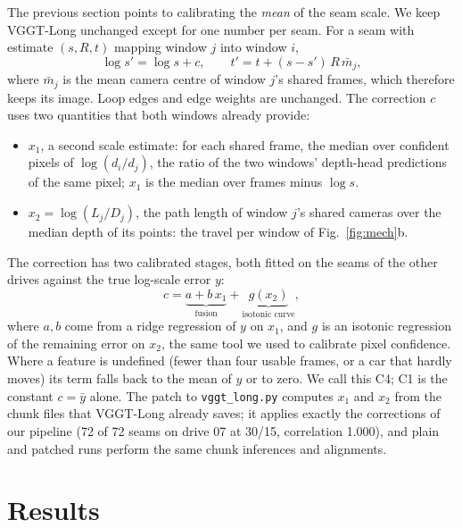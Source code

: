 \documentclass[conference]{IEEEtran}
\begin{document}
The previous section points to calibrating the \emph{mean} of the seam scale. We keep VGGT-Long unchanged except for one
number per seam. For a seam with estimate $(s,R,t)$ mapping window $j$ into window $i$,
\begin{equation}
\log s' = \log s + c,\qquad t' = t + (s-s')\,R\,\bar m_j,
\label{eq:correct}
\end{equation}
where $\bar m_j$ is the mean camera centre of window $j$'s shared frames, which therefore keeps its image. Loop edges and
edge weights are unchanged. The correction $c$ uses two quantities that both windows already provide:
\begin{itemize}
\item $x_1$, a second scale estimate: for each shared frame, the median over confident pixels of $\log(d_i/d_j)$, the
ratio of the two windows' depth-head predictions of the same pixel; $x_1$ is the median over frames minus $\log s$.
\item $x_2=\log(L_j/D_j)$, the path length of window $j$'s shared cameras over the median depth of its points: the
travel per window of Fig.~\ref{fig:mech}b.
\end{itemize}
The correction has two calibrated stages, both fitted on the seams of the other drives against the true log-scale error
$y$:
\begin{equation}
c = \underbrace{a + b\,x_1}_{\text{fusion}} + \underbrace{g(x_2)}_{\text{isotonic curve}},
\end{equation}
where $a,b$ come from a ridge regression of $y$ on $x_1$, and $g$ is an isotonic regression \cite{kuleshov} of the
remaining error on $x_2$, the same tool we used to calibrate pixel confidence. Where a feature is undefined (fewer than
four usable frames, or a car that hardly moves) its term falls back to the mean of $y$ or to zero. We call this C4; C1
is the constant $c=\bar y$ alone. The patch to \texttt{vggt\_long.py} computes $x_1$ and $x_2$ from the chunk files that
VGGT-Long already saves; it applies exactly the corrections of our pipeline (72 of 72 seams on drive 07 at 30/15,
correlation 1.000), and plain and patched runs perform the same chunk inferences and alignments.

\section{Results}
\label{sec:results}
\end{document}
